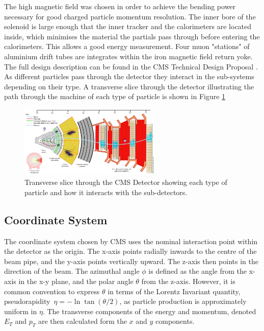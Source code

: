 The high magnetic field was chosen in order to achieve the bending power necessary for good charged particle momentum resolution. The inner bore of the solenoid is large enough that the inner tracker and the calorimeters are located inside, which minimises the material the partials pass through before entering the calorimeters. This allows a good energy measurement. Four muon "stations" of aluminium drift tubes are integrates within the   iron magnetic field return yoke. The full design description can be found in the CMS Technical Design Proposal \cite{CMSTDP}. As different particles pass through the detector they interact in the sub-systems depending on their type. A transverse slice through the detector illustrating the path through the machine of each type of particle is shown in Figure \ref{fig:CMS_Slice} 





\begin{figure}
\centering
\includegraphics[width=0.6\textwidth]{Figures/Detector/CMS_Slice}
\caption{Transverse slice through the CMS Detector showing each type of particle and how it interacts with the sub-detectors.}
\label{fig:CMS_Slice}
\end{figure}
\subsection{Coordinate System}

The coordinate system chosen by CMS uses the nominal interaction point within the detector as the origin. The x-axis points radially inwards to the centre of the beam pipe, and the y-axis points vertically upward. The z-axis then points in the direction of the beam. The azimuthal angle $\phi$ is defined as the angle from the x-axis in the x-y plane, and the polar angle $\theta$ from the z-axis. However, it is common convention to express $\theta$ in terms of the Lorentz Invariant quantity, pseudorapidity~\begin{math}
\eta = -\ln \tan (\theta / 2) 
\end{math}, as particle production is approximately uniform in $\eta$. The transverse components of the energy and momentum, denoted $E_{T}$ and $p_{T}$ are then calculated form the $x$ and $y$ components. 



